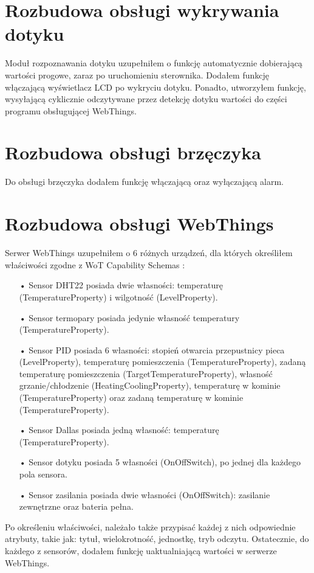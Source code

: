 \documentclass[11pt]{report}
\begin{document}
 \section{Rozbudowa obsługi wykrywania dotyku}
 Moduł rozpoznawania dotyku uzupełniłem o funkcję automatycznie dobierającą wartości progowe, zaraz po uruchomieniu sterownika. Dodałem funkcję włączającą wyświetlacz LCD po wykryciu dotyku. Ponadto, utworzyłem funkcję, wysyłającą cyklicznie odczytywane przez detekcję dotyku wartości do części programu obsługującej WebThings.
 
 \section{Rozbudowa obsługi brzęczyka}
 Do obsługi brzęczyka dodałem funkcję włączającą oraz wyłączającą alarm.
 
 \section{Rozbudowa obsługi WebThings}
 Serwer WebThings uzupełniłem o 6 różnych urządzeń, dla których określiłem właściwości zgodne z WoT Capability Schemas \cite{wotschemas2020}:
 \begin{enumerate}
 \item[•] Sensor DHT22 posiada dwie własności: temperaturę (TemperatureProperty) i wilgotność (LevelProperty).
 \item[•] Sensor termopary posiada jedynie własność temperatury (TemperatureProperty).
 \item[•] Sensor PID posiada 6 własności: stopień otwarcia przepustnicy pieca (LevelProperty), temperaturę pomieszczenia (TemperatureProperty), zadaną temperaturę pomieszczenia (TargetTemperatureProperty), własność grzanie/chłodzenie (HeatingCoolingProperty), temperaturę w kominie (TemperatureProperty) oraz zadaną temperaturę w kominie (TemperatureProperty).
 \item[•] Sensor Dallas posiada jedną własność: temperaturę (TemperatureProperty).
 \item[•] Sensor dotyku posiada 5 własności (OnOffSwitch), po jednej dla każdego pola sensora.
 \item[•] Sensor zasilania posiada dwie własności (OnOffSwitch): zasilanie zewnętrzne oraz bateria pełna.
 \end{enumerate}
 Po określeniu właściwości, należało także przypisać każdej z nich odpowiednie atrybuty, takie jak: tytuł, wielokrotność, jednostkę, tryb odczytu.
 Ostatecznie, do każdego z sensorów, dodałem funkcję uaktualniającą wartości w serwerze WebThings.
\end{document}
